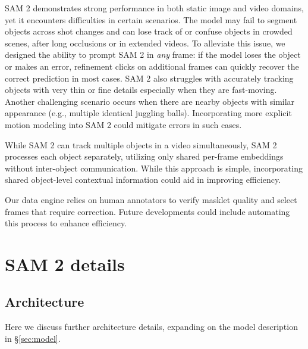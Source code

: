 \documentclass[]{fairmeta}
\newcommand{\secref}[1]{\S\ref{#1}}
\begin{document}
SAM 2 demonstrates strong performance in both static image and video domains, yet it encounters difficulties in certain scenarios. The model may fail to segment objects across shot changes and can lose track of or confuse objects in crowded scenes, after long occlusions or in extended videos. To alleviate this issue, we designed the ability to prompt SAM 2 in \textit{any} frame: if the model loses the object or makes an error, refinement clicks on additional frames can quickly recover the correct prediction in most cases. SAM 2 also struggles with accurately tracking objects with very thin or fine details especially when they are fast-moving. Another challenging scenario occurs when there are nearby objects with similar appearance (e.g., multiple identical juggling balls). Incorporating more explicit motion modeling into SAM 2 could mitigate errors in such cases. 

While SAM 2 can track multiple objects in a video simultaneously, SAM 2 processes each object separately, utilizing only shared per-frame embeddings without inter-object communication. While this approach is simple, incorporating shared object-level contextual information could aid in improving efficiency.

Our data engine relies on human annotators to verify masklet quality and select frames that require correction. Future developments could include automating this process to enhance efficiency.



\section{SAM 2 details}
\label{sec:savi_model_appendix}

\subsection{Architecture}

Here we discuss further architecture details, expanding on the model description in \secref{sec:model}.
\end{document}
